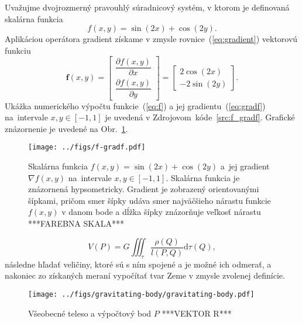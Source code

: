 \documentclass[a4paper, 12pt]{book}
\newcommand{\diff}{\mathrm d}
\let\vec\mathbf
\begin{document}
Uvažujme dvojrozmerný pravouhlý súradnicový systém, v ktorom je definovaná 
skalárna funkcia
%
\begin{equation}
\label{eq:f}
f(x, y) = \sin(2x) + \cos(2y){.}
\end{equation}
%
Aplikáciou operátora gradient získame v zmysle rovnice~(\ref{eq:gradient}) 
vektorovú funkciu
%
\begin{equation}
\label{eq:gradf}
\vec f(x, y) =
\begin{bmatrix}
\dfrac{\partial f(x, y)}{\partial x} \\[2ex]
\dfrac{\partial f(x, y)}{\partial y}
\end{bmatrix}
=
\begin{bmatrix}
2 \cos(2x) \\[2ex]
-2 \sin(2y)
\end{bmatrix}
{.}
\end{equation}
%
Ukážka numerického výpočtu funkcie~(\ref{eq:f}) a jej 
gradientu~(\ref{eq:gradf}) na~intervale $x, y \in [-1, 1]$ je uvedená 
v Zdrojovom~kóde~\ref{src:f_gradf}.  Grafické znázornenie je uvedené na 
Obr.~\ref{fig:f_gradf}.



\begin{figure}[bt]
\centering
\texttt{[image: ../figs/f-gradf.pdf]}
\caption{Skalárna funkcia $f(x, y) = \sin(2x) + \cos(2y)$ a~jej gradient 
$\nabla f(x, y)$ na~intervale $x, y \in [-1, 1]$.  Skalárna funkcia je 
znázornená hypsometricky.  Gradient je zobrazený orientovanými šípkami, pričom 
smer šípky udáva smer najväčšieho nárastu funkcie $f(x, y)$ v danom bode 
a dĺžka šípky znázorňuje veľkosť nárastu ***FAREBNA SKALA***}
\label{fig:f_gradf}
\end{figure}


%
\begin{equation}
\label{eq:newton}
V(P) = G \iiint_{\tau} \frac{\rho(Q)}{l(P, Q)} \diff \tau(Q){,}
\end{equation}
%
následne hľadať veličiny, ktoré sú s ním spojené a je možné ich odmerať, 
a nakoniec zo získaných meraní vypočítať tvar Zeme v zmysle zvolenej definície.

\begin{figure}[bt]
\centering
\texttt{[image: ../figs/gravitating-body/gravitating-body.pdf]}
\caption{Všeobecné teleso a výpočtový bod $P$ ***VEKTOR R***}
\end{figure}
\end{document}

